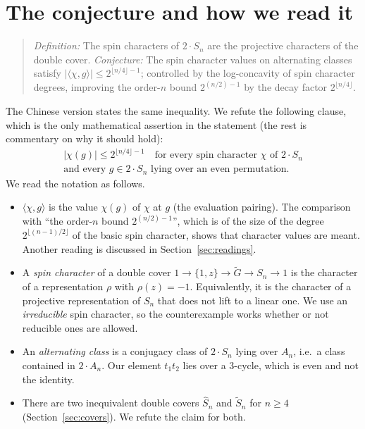 \documentclass[11pt]{article}
\theoremstyle{remark}
\newcommand{\Sh}{\widehat{S}}
\newcommand{\St}{\widetilde{S}}
\begin{document}
\section{The conjecture and how we read it}
\begin{quote}
\emph{Definition:} The spin characters of $2\cdot S_n$ are the projective characters of the
double cover. \emph{Conjecture:} The spin character values on alternating classes satisfy
$|\langle\chi,g\rangle|\le 2^{\lfloor n/4\rfloor-1}$; controlled by the log-concavity of spin
character degrees, improving the order-$n$ bound $2^{(n/2)-1}$ by the decay factor
$2^{\lfloor n/4\rfloor}$.
\end{quote}
The Chinese version states the same inequality. We refute the following clause, which is the
only mathematical assertion in the statement (the rest is commentary on why it should hold):
\begin{equation}\label{eq:claim}
\begin{gathered}
|\chi(g)|\le 2^{\lfloor n/4\rfloor-1}\quad\text{for every spin character $\chi$ of $2\cdot S_n$}\\
\text{and every $g\in 2\cdot S_n$ lying over an even permutation.}
\end{gathered}
\end{equation}
We read the notation as follows.
\begin{itemize}
\item $\langle\chi,g\rangle$ is the value $\chi(g)$ of $\chi$ at $g$ (the evaluation pairing).
  The comparison with ``the order-$n$ bound $2^{(n/2)-1}$'', which is of the size of the degree
  $2^{\lfloor (n-1)/2\rfloor}$ of the basic spin character, shows that character values are
  meant. Another reading is discussed in Section~\ref{sec:readings}.
\item A \emph{spin character} of a double cover $1\to\{1,z\}\to\widetilde G\to S_n\to1$ is the
  character of a representation $\rho$ with $\rho(z)=-1$. Equivalently, it is the character of a
  projective representation of $S_n$ that does not lift to a linear one. We use an \emph{irreducible} spin character, so the
  counterexample works whether or not reducible ones are allowed.
\item An \emph{alternating class} is a conjugacy class of $2\cdot S_n$ lying over $A_n$, i.e.\ a
  class contained in $2\cdot A_n$. Our element $t_1t_2$ lies over a $3$-cycle, which is even and
  not the identity.
\item There are two inequivalent double covers $\Sh_n$ and $\St_n$ for $n\ge4$
  (Section~\ref{sec:covers}). We refute the claim for both.
\end{itemize}
\end{document}
